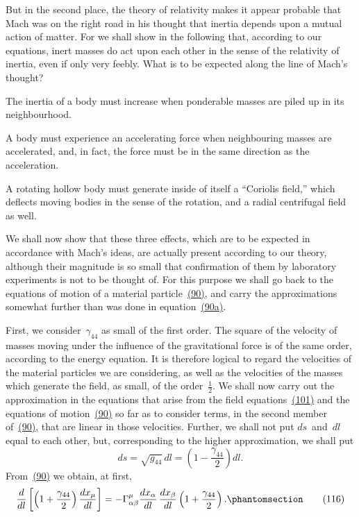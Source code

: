 \documentclass[12pt]{book}[2005/09/16]
\renewenvironment{itemize}{%
  \begin{list}{}{\setlength{\topsep}{4pt plus 8pt}%
      \setlength{\itemsep}{0pt plus 2pt}%
      \setlength{\parsep}{4pt plus 2pt}%
      \setlength{\leftmargin}{4em}}}{\end{list}}
\newcommand{\PageSep}[1]{\ignorespaces}
\newcommand{\Tag}[1]{%
  \phantomsection
  \label{eqn:#1}
  \tag*{#1}
}
\newcommand{\Eqref}[1]{\hyperref[eqn:#1]{#1}}
\begin{document}
But in the second place, the theory of relativity makes
it appear probable that Mach was on the right road in
%
his thought that inertia depends upon a mutual action of
matter. For we shall show in the following that, according
to our equations, inert masses do act upon each other
in the sense of the relativity of inertia, even if only very
feebly. What is to be expected along the line of Mach's
thought?
\begin{itemize}
\item[1.] The inertia of a body must increase when ponderable
  masses are piled up in its neighbourhood.

\item[2.] A body must experience an accelerating force when
  neighbouring masses are accelerated, and, in fact,
  the force must be in the same direction as the
  acceleration.

\item[3.] A rotating hollow body must generate inside of
  itself a ``Coriolis field,'' which deflects moving
  bodies in the sense of the rotation, and a radial
  centrifugal field as well.
\end{itemize}
\PageSep{111}

We shall now show that these three effects, which are
to be expected in accordance with Mach's ideas, are
%
actually present according to our theory, although their
magnitude is so small that confirmation of them by
laboratory experiments is not to be thought of. For this
purpose we shall go back to the equations of motion of
a material particle~\Eqref{(90)}, and carry the approximations
somewhat further than was done in equation~\Eqref{(90a)}.

First, we consider~$\gamma_{44}$ as small of the first order. The
square of the velocity of masses moving under the influence
of the gravitational force is of the same order, according
to the energy equation. It is therefore logical to regard
the velocities of the material particles we are considering,
as well as the velocities of the masses which generate the
field, as small, of the order~$\frac{1}{2}$. We shall now carry out the
approximation in the equations that arise from the field
equations~\Eqref{(101)} and the equations of motion~\Eqref{(90)} so far
as to consider terms, in the second member of~\Eqref{(90)}, that
are linear in those velocities. Further, we shall not put
$ds$~and~$dl$ equal to each other, but, corresponding to the
higher approximation, we shall put
\[
ds = \sqrt{g_{44}}\, dl
  = \left(1 - \frac{\gamma_{44}}{2}\right) dl.
\]
From~\Eqref{(90)} we obtain, at first,
\[
\frac{d}{dl}\left[\left(1 + \frac{\gamma_{44}}{2}\right) \frac{dx_{\mu}}{dl}\right]
  = -\Gamma_{\alpha\beta}^{\mu} \frac{dx_{\alpha}}{dl}\, \frac{dx_{\beta}}{dl}
    \left(1 + \frac{\gamma_{44}}{2}\right).
\Tag{(116)}
\]
\end{document}
